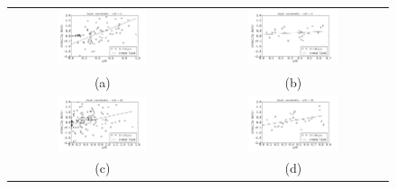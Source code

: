 \begin{figure}[!htb]
 \centering
\begin{tabular}{cc}
 \includegraphics[width=0.5\textwidth]{./figuras/chap5/dispersion/class0_5.png} & \includegraphics[width=0.5\textwidth]{./figuras/chap5/dispersion/class4_5.png} \\
(a) & (b) \\
 \includegraphics[width=0.5\textwidth]{./figuras/chap5/dispersion/class0_10.png} & \includegraphics[width=0.5\textwidth]{./figuras/chap5/dispersion/class4_10.png} \\
(c) & (d) \\

\end{tabular}
\end{figure}
